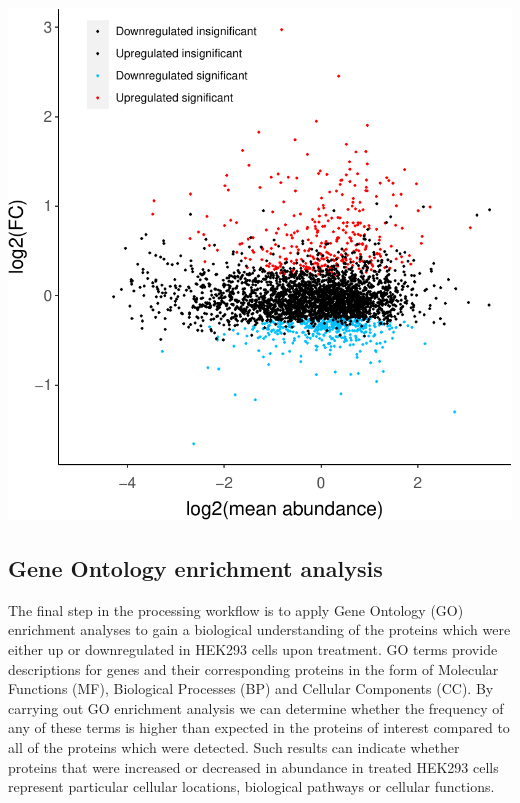 \documentclass[9pt,a4paper,]{extarticle}
\begin{document}
\begin{center}\includegraphics[height=0.4\textheight]{workflow_expressions_files/figure-latex/MA_plot-1} \end{center}

\hypertarget{gene-ontology-enrichment-analysis}{%
\subsection{Gene Ontology enrichment analysis}\label{gene-ontology-enrichment-analysis}}

The final step in the processing workflow is to apply Gene Ontology (GO) enrichment
analyses to gain a biological understanding of the proteins which were either up
or downregulated in HEK293 cells upon treatment. GO terms provide descriptions
for genes and their corresponding proteins in the form of Molecular Functions
(MF), Biological Processes (BP) and Cellular Components (CC). By carrying out GO
enrichment analysis we can determine whether the frequency of any of these terms
is higher than expected in the proteins of interest compared to all of the proteins
which were detected. Such results can indicate whether proteins that were
increased or decreased in abundance in treated HEK293 cells represent particular
cellular locations, biological pathways or cellular functions.
\end{document}
